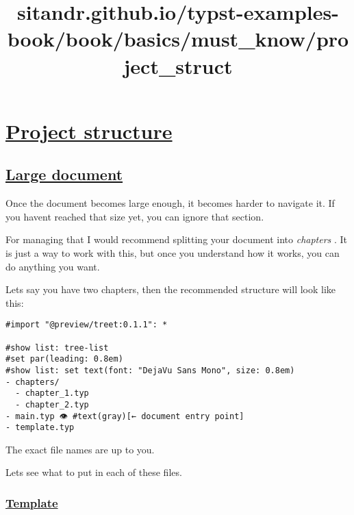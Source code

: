 \pandocbounded{}

\pandocbounded{}


\title{sitandr.github.io/typst-examples-book/book/basics/must_know/project_struct}

\section{\texorpdfstring{\hyperref[project-structure]{Project
structure}}{Project structure}}\label{project-structure}

\subsection{\texorpdfstring{\hyperref[large-document]{Large
document}}{Large document}}\label{large-document}

Once the document becomes large enough, it becomes harder to navigate
it. If you haven\textquotesingle t reached that size yet, you can ignore
that section.

For managing that I would recommend splitting your document into
\emph{chapters} . It is just a way to work with this, but once you
understand how it works, you can do anything you want.

Let\textquotesingle s say you have two chapters, then the recommended
structure will look like this:

\begin{verbatim}
#import "@preview/treet:0.1.1": *

#show list: tree-list
#set par(leading: 0.8em)
#show list: set text(font: "DejaVu Sans Mono", size: 0.8em)
- chapters/
  - chapter_1.typ
  - chapter_2.typ
- main.typ 👁 #text(gray)[← document entry point]
- template.typ
\end{verbatim}

\pandocbounded{}

The exact file names are up to you.

Let\textquotesingle s see what to put in each of these files.

\subsubsection{\texorpdfstring{\hyperref[template]{Template}}{Template}}\label{template}

